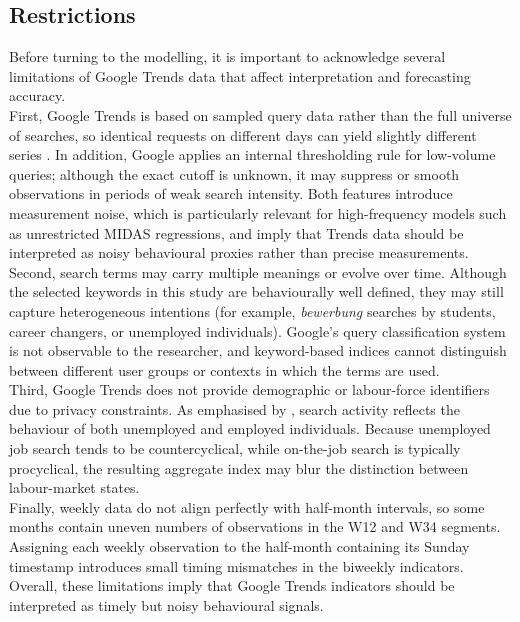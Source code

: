 \documentclass[12pt,a4paper]{article}
\begin{document}
\subsection{Restrictions}
Before turning to the modelling, it is important to acknowledge several limitations of Google Trends data that affect interpretation and forecasting accuracy.\\
First, Google Trends is based on sampled query data rather than the full universe of searches, so identical requests on different days can yield slightly different series \citep{carrier}. In addition, Google applies an internal thresholding rule for low-volume queries; although the exact cutoff is unknown, it may suppress or smooth observations in periods of weak search intensity. Both features introduce measurement noise, which is particularly relevant for high-frequency models such as unrestricted MIDAS regressions, and imply that Trends data should be interpreted as noisy behavioural proxies rather than precise measurements.\\
Second, search terms may carry multiple meanings or evolve over time. Although the selected keywords in this study are behaviourally well defined, they may still capture heterogeneous intentions (for example, \textit{bewerbung} searches by students, career changers, or unemployed individuals). Google’s query classification system is not observable to the researcher, and keyword-based indices cannot distinguish between different user groups or contexts in which the terms are used.\\
Third, Google Trends does not provide demographic or labour-force identifiers due to privacy constraints. As emphasised by \citet{D'Amuri2010Google}, search activity reflects the behaviour of both unemployed and employed individuals. Because unemployed job search tends to be countercyclical, while on-the-job search is typically procyclical, the resulting aggregate index may blur the distinction between labour-market states.\\
Finally, weekly data do not align perfectly with half-month intervals, so some months contain uneven numbers of observations in the W12 and W34 segments. Assigning each weekly observation to the half-month containing its Sunday timestamp introduces small timing mismatches in the biweekly indicators.\\
Overall, these limitations imply that Google Trends indicators should be interpreted as timely but noisy behavioural signals. 
\end{document}
